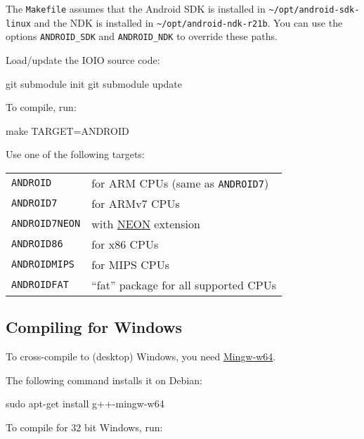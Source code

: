 The \texttt{Makefile} assumes that the Android SDK is installed in
\verb|~/opt/android-sdk-linux| and the NDK is installed in
\verb|~/opt/android-ndk-r21b|.  You can use the options
\verb|ANDROID_SDK| and \verb|ANDROID_NDK| to override these paths.

Load/update the IOIO source code:

\begin{verbatim*}
git submodule init
git submodule update
\end{verbatim*}

To compile, run:

\begin{verbatim*}
make TARGET=ANDROID
\end{verbatim*}

Use one of the following targets:

\begin{tabularx}{1.9\textwidth}{lX}

\texttt{ANDROID} & for ARM CPUs (same as \texttt{ANDROID7}) \\

\texttt{ANDROID7} & for ARMv7 CPUs \\

\texttt{ANDROID7NEON} & with
\href{http://www.arm.com/products/processors/technologies/neon.php}{NEON}
extension \\

\texttt{ANDROID86} & for x86 CPUs \\

\texttt{ANDROIDMIPS} & for MIPS CPUs \\

\texttt{ANDROIDFAT} & ``fat'' package for all supported CPUs \\

\end{tabularx}

\subsection{Compiling for Windows}

To cross-compile to (desktop) Windows, you need
\href{http://mingw-w64.org}{Mingw-w64}.

The following command installs it on Debian:

\begin{verbatim*}
sudo apt-get install g++-mingw-w64
\end{verbatim*}

To compile for 32 bit Windows, run:

